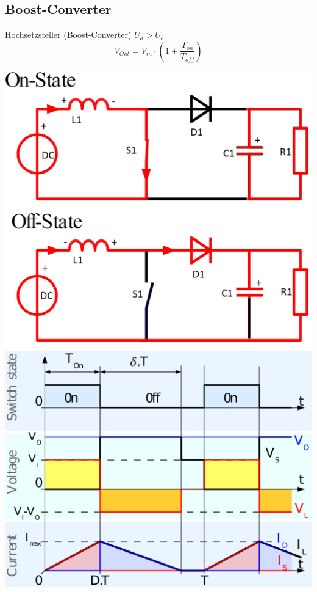 \subsection{Boost-Converter}
\begin{minipage}{0.75\linewidth}
    Hochsetzsteller (Boost-Converter) $U_a > U_e  $\newline
    \[ V_{Out}=V_{in}\cdot \left(1+\frac{T_{on}}{T_{off}} \right)\]
    
\end{minipage}
\begin{minipage}{0.25\linewidth}
    \includegraphics[width=\linewidth]{images/BoostOnOff}
    \includegraphics[width=\linewidth]{images/BoostSwitch}
\end{minipage}



